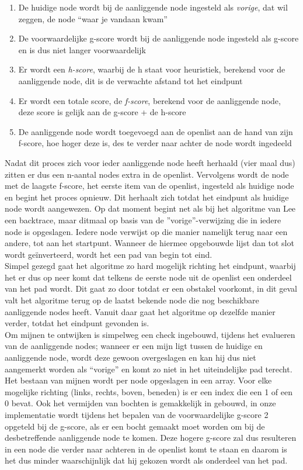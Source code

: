 \documentclass{report}
\begin{document}
\begin{enumerate}
	\item De huidige node wordt bij de aanliggende node ingesteld als \textit{vorige}, dat wil zeggen, de node ``waar je vandaan kwam''
	\item De voorwaardelijke g-score wordt bij de aanliggende node ingesteld als g-score en is dus niet langer voorwaardelijk
	\item Er wordt een \textit{h-score}, waarbij de h staat voor heuristiek, berekend voor de aanliggende node, dit is de verwachte afstand tot het eindpunt
	\item Er wordt een totale score, de \textit{f-score}, berekend voor de aanliggende node, deze score is gelijk aan de g-score + de h-score
	\item De aanliggende node wordt toegevoegd aan de openlist aan de hand van zijn f-score, hoe hoger deze is, des te verder naar achter de node wordt ingedeeld
\end{enumerate}

\noindent
Nadat dit proces zich voor ieder aanliggende node heeft herhaald (vier maal dus) zitten er dus een n-aantal nodes extra in de openlist.
Vervolgens wordt de node met de laagste f-score, het eerste item van de openlist, ingesteld als huidige node en begint het proces opnieuw.
Dit herhaalt zich totdat het eindpunt als huidige node wordt aangewezen.
Op dat moment begint net als bij het algoritme van Lee een backtrace, maar ditmaal op basis van de ''vorige''-verwijzing die in iedere node is opgeslagen.
Iedere node verwijst op die manier namelijk terug naar een andere, tot aan het startpunt.
Wanneer de hiermee opgebouwde lijst dan tot slot wordt geïnverteerd, wordt het een pad van begin tot eind.
\\

\noindent
Simpel gezegd gaat het algoritme zo hard mogelijk richting het eindpunt, waarbij het er dus op neer komt dat telkens de eerste node uit de openlist een onderdeel van het pad wordt.
Dit gaat zo door totdat er een obstakel voorkomt, in dit geval valt het algoritme terug op de laatst bekende node die nog beschikbare aanliggende nodes heeft.
Vanuit daar gaat het algoritme op dezelfde manier verder, totdat het eindpunt gevonden is.
\\

\noindent
Om mijnen te ontwijken is simpelweg een check ingebouwd, tijdens het evalueren van de aanliggende nodes; wanneer er een mijn ligt tussen de huidige en aanliggende node, wordt deze gewoon overgeslagen en kan hij dus niet aangemerkt worden als ``vorige'' en komt zo niet in het uiteindelijke pad terecht.
Het bestaan van mijnen wordt per node opgeslagen in een array.
Voor elke mogelijke richting (links, rechts, boven, beneden) is er een index die een 1 of een 0 bevat.
Ook het vermijden van bochten is gemakkelijk in gebouwd, in onze implementatie wordt tijdens het bepalen van de voorwaardelijke g-score 2 opgeteld bij de g-score, als er een bocht gemaakt moet worden om bij de desbetreffende aanliggende node te komen.
Deze hogere g-score zal dus resulteren in een node die verder naar achteren in de openlist komt te staan en daarom is het dus minder waarschijnlijk dat hij gekozen wordt als onderdeel van het pad.
\\
\end{document}

